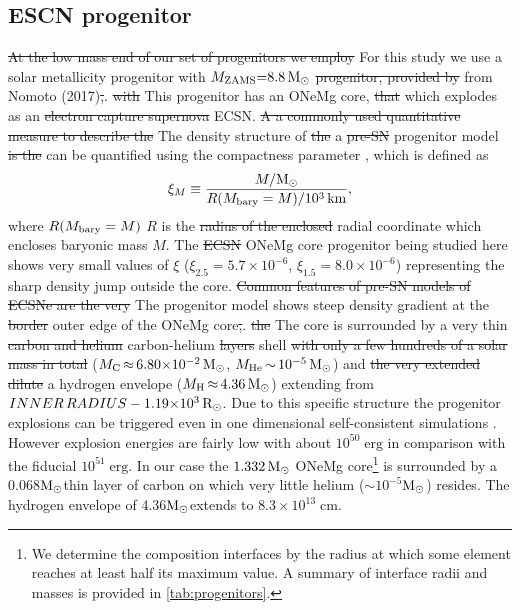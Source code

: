 \documentclass[fleqn,usenatbib]{mnras}
\newcommand{\solr}{\xspace\ensuremath{\rm{R_{\odot}}}}
\newcommand{\solm}{\xspace\ensuremath{\rm{M_{\odot}}}}
\newcommand{\NY}[2]{{\color{blue}\sout{#1}#2}}
\begin{document}
\subsection{ESCN progenitor}
\NY{At the low mass end of our set of progenitors we employ}{ For this study we use} a solar metallicity \NY{}{progenitor with} $M_{\rm ZAMS}\mathord{=}8.8\,\solm$ \NY{progenitor, provided by}{ from} Nomoto (2017)\NY{,}{.} \NY{with}{ This progenitor has} an ONeMg core\NY{}{,} \NY{that}{ which} explodes as an \NY{electron capture supernova}{ ECSN}. \NY{A a commonly used quantitative measure to describe the}{ The} density structure of \NY{the}{ a} \NY{pre-SN}{ progenitor} model \NY{is  the}{ can be quantified using the} compactness parameter \citep{Oconnor2011}\NY{}{,} \NY{}{which is defined as}
\begin{equation}
\label{equ:compactness}
  \xi_{M} \equiv \frac{M/\solm}{R(M_{\rm bary}=M)/10^{3}\, \rm km},
\end{equation}
where \NY{$R(M_{\rm bary}=M)$}{ $R$} is the \NY{radius of the enclosed}{ radial coordinate which encloses} baryonic mass \NY{}{$M$}. The \NY{ECSN}{ ONeMg core} progenitor \NY{}{being studied here} shows very small values of $\xi$ ($\xi_{2.5}=5.7\times10^{-6}$, $\xi_{1.5}=8.0\times10^{-6}$)  representing the sharp density jump outside the core. \NY{Common features of pre-SN models of ECSNe are the very}{ The progenitor model shows} steep density gradient at the \NY{border}{ outer edge} of the ONeMg core\NY{,}{.} \NY{the}{ The core is surrounded by a} very thin \NY{carbon and helium}{ carbon-helium} \NY{layers}{ shell} \NY{with only a few hundreds of a solar mass in total}{ ($M_{\rm C}\,\mathord{\approx}\, 6.80\mathord{\times}10^{-2}\, \solm$, $M_{\rm He}\,\mathord{\sim}\,10^{-5}\, \solm$)} and \NY{the very extended dilute}{ a} hydrogen envelope \NY{}{($M_{\rm H}\,\mathord{\approx}\, 4.36\, \solm$) extending from $INNER\, RADIUS- \mathord{1.19}\mathord{\times}10^{3}\, \solr$}.
Due to this specific structure the progenitor explosions can be triggered even in one dimensional self-consistent simulations \citet{VonGroote, Kitaura2006}. However explosion energies are fairly low with about $10^{50}\;\mathrm{erg}$ in comparison with the fiducial $10^{51}\;\mathrm{erg}$. In our case the $1.332\, \solm$ ONeMg core\footnote{We determine the composition interfaces by the radius at which some element reaches at least half its maximum value. A summary of interface radii and masses is provided in \autoref{tab:progenitors}.} is surrounded by a 0.068\solm thin layer of carbon on which very little helium ($\sim 10^{-5}$\solm) resides. The hydrogen envelope of 4.36\solm extends to $8.3\times10^{13}\;\mathrm{cm}$. 
\end{document}
